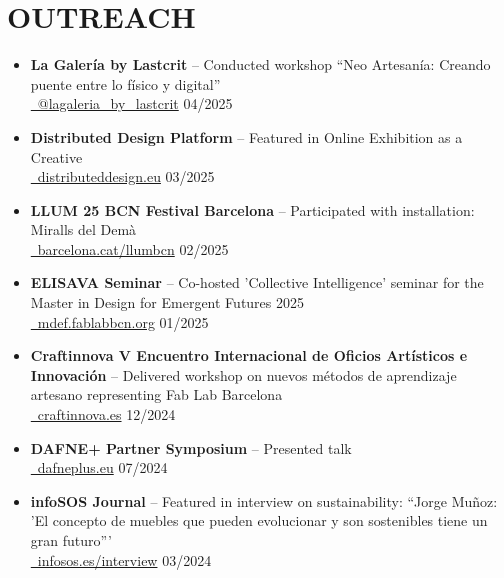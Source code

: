 \documentclass[11pt,a4paper]{article}
\begin{document}
\section*{OUTREACH}
\begin{itemize}[leftmargin=*,label={},itemsep=2pt]
    \item \textbf{La Galería by Lastcrit} -- Conducted workshop ``Neo Artesanía: Creando puente entre lo físico y digital''\\
    \href{https://www.instagram.com/lagaleria_by_lastcrit/}{\faInstagram\ @lagaleria\_by\_lastcrit} \hfill 04/2025
    
    \item \textbf{Distributed Design Platform} -- Featured in Online Exhibition as a Creative\\
    \href{https://distributeddesign.eu/}{\faGlobe\ distributeddesign.eu} \hfill 03/2025
    
    \item \textbf{LLUM 25 BCN Festival Barcelona} -- Participated with installation: Miralls del Demà\\
    \href{https://www.barcelona.cat/llumbcn/es}{\faGlobe\ barcelona.cat/llumbcn} \hfill 02/2025
    
    \item \textbf{ELISAVA Seminar} -- Co-hosted 'Collective Intelligence' seminar for the Master in Design for Emergent Futures 2025\\
    \href{https://mdef.fablabbcn.org/}{\faGlobe\ mdef.fablabbcn.org} \hfill 01/2025
    
    \item \textbf{Craftinnova V Encuentro Internacional de Oficios Artísticos e Innovación} -- Delivered workshop on nuevos métodos de aprendizaje artesano representing Fab Lab Barcelona\\
    \href{https://www.craftinnova.es/}{\faGlobe\ craftinnova.es} \hfill 12/2024
    
    \item \textbf{DAFNE+ Partner Symposium} -- Presented talk\\
    \href{https://dafneplus.eu/}{\faGlobe\ dafneplus.eu} \hfill 07/2024
    
    \item \textbf{infoSOS Journal} -- Featured in interview on sustainability: ``Jorge Muñoz: 'El concepto de muebles que pueden evolucionar y son sostenibles tiene un gran futuro'''\\
    \href{https://infosos.es/jorge-munoz-el-concepto-de-muebles-que-pueden-evolucionar-y-son-sostenibles-tiene-un-gran-futuro/}{\faNewspaper\ infosos.es/interview} \hfill 03/2024
    

\end{itemize}
\end{document}
